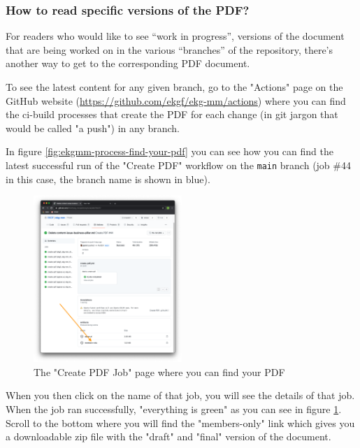 \subsubsection{How to read specific versions of the PDF?}

For readers who would like to see “work in progress”, versions of the document 
that are being worked on in the various “branches” of the repository, 
there’s another way to get to the corresponding PDF document.

To see the latest content for any given branch, go to the "Actions" page 
on the GitHub website (\url{https://github.com/ekgf/ekg-mm/actions}) where you can 
find the \gls{ci}-build processes that create the PDF for each change 
(in git jargon that would be called "a push") in any branch.

In figure \ref{fig:ekgmm-process-find-your-pdf} you can see how you can 
find the latest successful run of the "Create PDF" workflow on the 
\texttt{main} branch (job \#44 in this case, the branch name is shown in blue).

%
%
\begin{figure}
    \vspace{-12pt}
    \begin{center}
        \includegraphics[width=0.50\textwidth]{../images/ekgmm-process-create-pdf-job.png}
    \end{center}
    \caption{The "Create PDF Job" page where you can find your PDF}
    \label{fig:ekgmm-process-create-pdf-job}
\end{figure}

When you then click on the name of that job, you will see the details of that job.
When the job ran successfully, "everything is green" as you can see in figure
\ref{fig:ekgmm-process-create-pdf-job}.
Scroll to the bottom where you will find the "members-only" link which gives you
a downloadable zip file with the "draft" and "final" version of the document.

